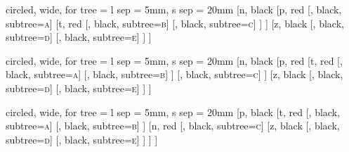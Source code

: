 \begin{page}
	\begin{forest}
		circled,
		wide,
		for tree = {%
				l sep = 5mm,
				s sep = 20mm
		}
		[n, black
			[p, red
				[, black, subtree={\textsc{a}}]
				[t, red
					[, black, subtree={\textsc{b}}]
					[, black, subtree={\textsc{c}}]
				]
			]
			[z, black
				[, black, subtree={\textsc{d}}]
				[, black, subtree={\textsc{e}}]
			]
		]
	\end{forest}
\end{page}

\begin{page}
	\begin{forest}
		circled,
		wide,
		for tree = {%
				l sep = 5mm,
				s sep = 20mm
		}
		[n, black
			[p, red
				[t, red
					[, black, subtree={\textsc{a}}]
					[, black, subtree={\textsc{b}}]
				]
				[, black, subtree={\textsc{c}}]
			]
			[z, black
				[, black, subtree={\textsc{d}}]
				[, black, subtree={\textsc{e}}]
			]
		]
	\end{forest}
\end{page}

\begin{page}
	\begin{forest}
		circled,
		wide,
		for tree = {%
				l sep = 5mm,
				s sep = 20mm
		}
		[p, black
			[t, red
					[, black, subtree={\textsc{a}}]
					[, black, subtree={\textsc{b}}]
			]
			[n, red
				[, black, subtree={\textsc{c}}]
				[z, black
					[, black, subtree={\textsc{d}}]
					[, black, subtree={\textsc{e}}]
				]
			]
		]
	\end{forest}
\end{page}

